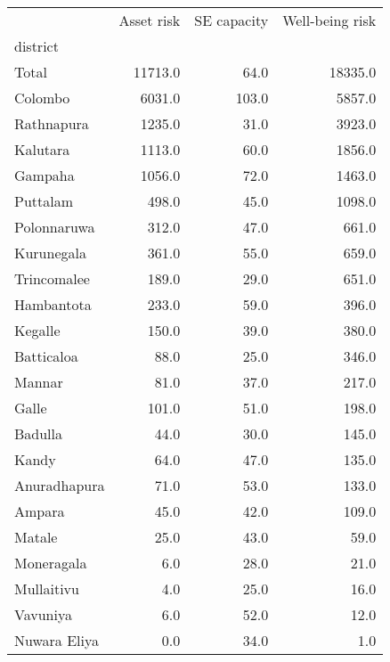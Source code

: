 \begin{tabular}{lrrr}
\toprule
{} &  Asset risk &  SE capacity &  Well-being risk \\
district     &             &              &                  \\
\midrule
Total        &     11713.0 &         64.0 &          18335.0 \\
Colombo      &      6031.0 &        103.0 &           5857.0 \\
Rathnapura   &      1235.0 &         31.0 &           3923.0 \\
Kalutara     &      1113.0 &         60.0 &           1856.0 \\
Gampaha      &      1056.0 &         72.0 &           1463.0 \\
Puttalam     &       498.0 &         45.0 &           1098.0 \\
Polonnaruwa  &       312.0 &         47.0 &            661.0 \\
Kurunegala   &       361.0 &         55.0 &            659.0 \\
Trincomalee  &       189.0 &         29.0 &            651.0 \\
Hambantota   &       233.0 &         59.0 &            396.0 \\
Kegalle      &       150.0 &         39.0 &            380.0 \\
Batticaloa   &        88.0 &         25.0 &            346.0 \\
Mannar       &        81.0 &         37.0 &            217.0 \\
Galle        &       101.0 &         51.0 &            198.0 \\
Badulla      &        44.0 &         30.0 &            145.0 \\
Kandy        &        64.0 &         47.0 &            135.0 \\
Anuradhapura &        71.0 &         53.0 &            133.0 \\
Ampara       &        45.0 &         42.0 &            109.0 \\
Matale       &        25.0 &         43.0 &             59.0 \\
Moneragala   &         6.0 &         28.0 &             21.0 \\
Mullaitivu   &         4.0 &         25.0 &             16.0 \\
Vavuniya     &         6.0 &         52.0 &             12.0 \\
Nuwara Eliya &         0.0 &         34.0 &              1.0 \\
\bottomrule
\end{tabular}

